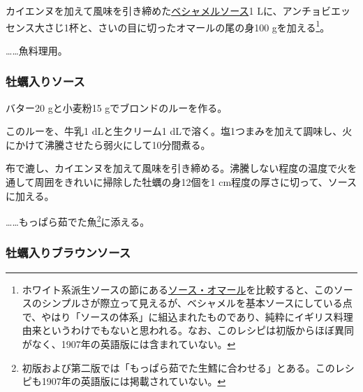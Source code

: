 \begin{recette}
カイエンヌを加えて風味を引き締めた\protect\hyperlink{sauce-bechamel}{ベシャメルソース}1
Lに、アンチョビエッセンス大さじ1杯と、さいの目に切ったオマールの尾の身100
gを加える\footnote{ホワイト系派生ソースの節にある\protect\hyperlink{sauce-homard}{ソース・オマール}を比較すると、このソースのシンプルさが際立って見えるが、ベシャメルを基本ソースにしている点で、やはり「ソースの体系」に組込まれたものであり、純粋にイギリス料理由来というわけでもないと思われる。なお、このレシピは初版からほぼ異同がなく、1907年の英語版には含まれていない。}。

\ldots{}\ldots{}魚料理用。

\hypertarget{oyster-sauce}{%
\subsubsection{牡蠣入りソース}\label{oyster-sauce}}



バター20 gと小麦粉15 gでブロンドのルーを作る。

このルーを、牛乳1 dLと生クリーム1
dLで溶く。塩1つまみを加えて調味し、火にかけて沸騰させたら弱火にして10分間煮る。

布で漉し、カイエンヌを加えて風味を引き締める。沸騰しない程度の温度で火を通して周囲をきれいに掃除した牡蠣の身12個を1
cm程度の厚さに切って、ソースに加える。

\ldots{}\ldots{}もっぱら茹でた魚\footnote{初版および第二版では「もっぱら茹でた生鱈に合わせる」とある。このレシピも1907年の英語版には掲載されていない。}に添える。

\hypertarget{brown-oyster-sauce}{%
\subsubsection{牡蠣入りブラウンソース}\label{brown-oyster-sauce}}



\end{recette}

